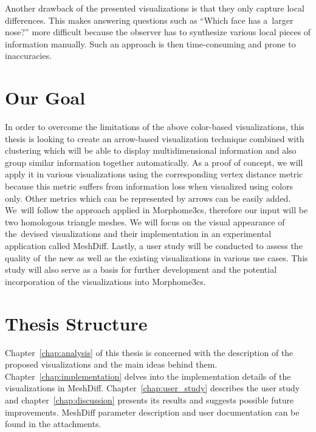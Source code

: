 
Another drawback of the presented visualizations is that they only capture local differences. This makes answering questions such as ``Which face has a~larger nose?'' more difficult because the observer has to synthesize various local pieces of information manually. Such an approach is then time-consuming and prone to inaccuracies.
\section*{Our Goal}

In order to overcome the limitations of the above color-based visualizations, this thesis is looking to create an arrow-based visualization technique combined with clustering which will be able to display multidimensional information and also group similar information together automatically. As a proof of concept, we will apply it in various visualizations using the corresponding vertex distance metric because this metric suffers from information loss when visualized using colors only. Other metrics which can be represented by arrows can be easily added. We~will follow the approach applied in Morphome3cs, therefore our input will be two homologous triangle meshes. We will focus on the visual appearance of the~devised visualizations and their implementation in an experimental application called MeshDiff. Lastly, a user study will be conducted to assess the quality of~the new as well as the existing visualizations in various use cases. This study will also serve as a basis for further development and the potential incorporation of the visualizations into Morphome3cs.
\section*{Thesis Structure}

Chapter~\ref{chap:analysis} of this thesis is concerned with the description of the proposed visualizations and the main ideas behind them. Chapter~\ref{chap:implementation} delves into the implementation details of the visualizations in MeshDiff. Chapter~\ref{chap:user_study} describes the user study and chapter~\ref{chap:discussion} presents its results and suggests possible future improvements. MeshDiff parameter description and user documentation can be found in the attachments.